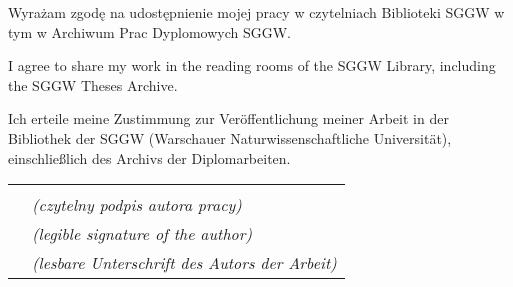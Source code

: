 \thispagestyle{empty}

\begin{singlespace}
	\begin{po}
		Wyrażam zgodę na udostępnienie mojej pracy w czytelniach Biblioteki SGGW w tym w Archiwum Prac Dyplomowych SGGW.
	\end{po}

	\bigskip

	I agree to share my work in the reading rooms of the SGGW Library, including the SGGW Theses Archive.

	\bigskip

	\begin{de}
		Ich erteile meine Zustimmung zur Veröffentlichung meiner Arbeit in der Bibliothek der SGGW (Warschauer Naturwissenschaftliche Universität), einschließlich des Archivs der Diplomarbeiten.
	\end{de}

	\vspace{2cm}

	\begin{tabular}{ll}
		 \makebox[6.8cm] & \makebox[7.4cm]{\dotfill}\\
		 & \textit{(czytelny podpis autora pracy)} \\
		 & \textit{(legible signature of the author)} \\
		 & \textit{(lesbare Unterschrift des Autors der Arbeit)} \\
	\end{tabular}
\end{singlespace}